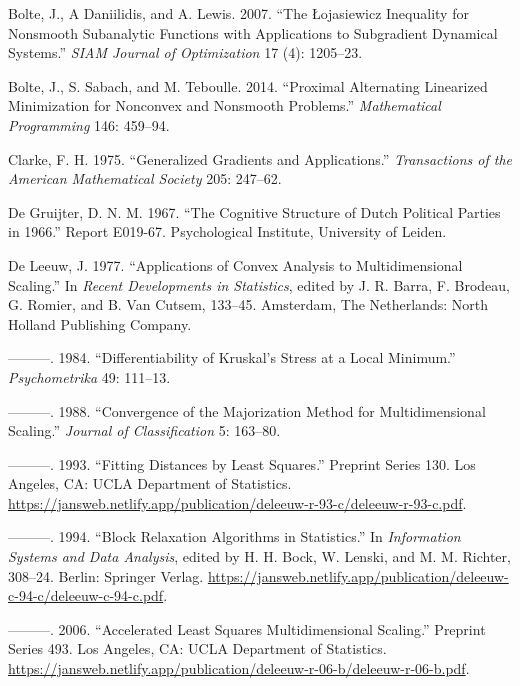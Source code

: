 \documentclass[
  12pt,
  letterpaper,
  DIV=11,
  numbers=noendperiod]{scrartcl}
\newlength{\cslhangindent}
\newenvironment{CSLReferences}[2] %
 {\begin{list}{}{%
  \setlength{\itemindent}{0pt}
  \setlength{\leftmargin}{0pt}
  \setlength{\parsep}{0pt}
  \ifodd #1
   \setlength{\leftmargin}{\cslhangindent}
   \setlength{\itemindent}{-1\cslhangindent}
  \fi
  \setlength{\itemsep}{#2\baselineskip}}}
 {\end{list}}
\begin{document}
\label{refs}
\begin{CSLReferences}{1}{0}
Bolte, J., A Daniilidis, and A. Lewis. 2007. {``The {Ł}ojasiewicz
Inequality for Nonsmooth Subanalytic Functions with Applications to
Subgradient Dynamical Systems.''} \emph{SIAM Journal of Optimization} 17
(4): 1205--23.

Bolte, J., S. Sabach, and M. Teboulle. 2014. {``Proximal Alternating
Linearized Minimization for Nonconvex and Nonsmooth Problems.''}
\emph{Mathematical Programming} 146: 459--94.

Clarke, F. H. 1975. {``Generalized Gradients and Applications.''}
\emph{Transactions of the American Mathematical Society} 205: 247--62.

De Gruijter, D. N. M. 1967. {``{The Cognitive Structure of Dutch
Political Parties in 1966}.''} Report E019-67. Psychological Institute,
University of Leiden.

De Leeuw, J. 1977. {``Applications of Convex Analysis to
Multidimensional Scaling.''} In \emph{Recent Developments in
Statistics}, edited by J. R. Barra, F. Brodeau, G. Romier, and B. Van
Cutsem, 133--45. Amsterdam, The Netherlands: North Holland Publishing
Company.

---------. 1984. {``{Differentiability of Kruskal's Stress at a Local
Minimum}.''} \emph{Psychometrika} 49: 111--13.

---------. 1988. {``Convergence of the Majorization Method for
Multidimensional Scaling.''} \emph{Journal of Classification} 5:
163--80.

---------. 1993. {``Fitting Distances by Least Squares.''} Preprint
Series 130. Los Angeles, CA: UCLA Department of Statistics.
\url{https://jansweb.netlify.app/publication/deleeuw-r-93-c/deleeuw-r-93-c.pdf}.

---------. 1994. {``{Block Relaxation Algorithms in Statistics}.''} In
\emph{Information Systems and Data Analysis}, edited by H. H. Bock, W.
Lenski, and M. M. Richter, 308--24. Berlin: Springer Verlag.
\url{https://jansweb.netlify.app/publication/deleeuw-c-94-c/deleeuw-c-94-c.pdf}.

---------. 2006. {``{Accelerated Least Squares Multidimensional
Scaling}.''} Preprint Series 493. Los Angeles, CA: UCLA Department of
Statistics.
\url{https://jansweb.netlify.app/publication/deleeuw-r-06-b/deleeuw-r-06-b.pdf}.


\end{CSLReferences}
\end{document}
